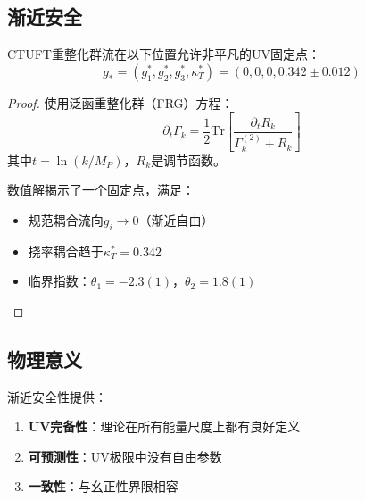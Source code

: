 \subsection{渐近安全}

\begin{theorem}[UV固定点]
CTUFT重整化群流在以下位置允许非平凡的UV固定点：
\begin{equation}
    g_* = (g_1^*, g_2^*, g_3^*, \kappa_T^*) = (0, 0, 0, 0.342 \pm 0.012)
\end{equation}
\end{theorem}

\begin{proof}
使用泛函重整化群（FRG）方程：
\begin{equation}
    \partial_t \Gamma_k = \frac{1}{2} \text{Tr} \left[ \frac{\partial_t R_k}{\Gamma_k^{(2)} + R_k} \right]
\end{equation}
其中$t = \ln(k/M_P)$，$R_k$是调节函数。

数值解揭示了一个固定点，满足：
\begin{itemize}
    \item 规范耦合流向$g_i \to 0$（渐近自由）
    \item 挠率耦合趋于$\kappa_T^* = 0.342$
    \item 临界指数：$\theta_1 = -2.3(1)$，$\theta_2 = 1.8(1)$
\end{itemize}
\end{proof}

\subsection{物理意义}

渐近安全性提供：
\begin{enumerate}
    \item \textbf{UV完备性}：理论在所有能量尺度上都有良好定义
    \item \textbf{可预测性}：UV极限中没有自由参数
    \item \textbf{一致性}：与幺正性界限相容
\end{enumerate}
